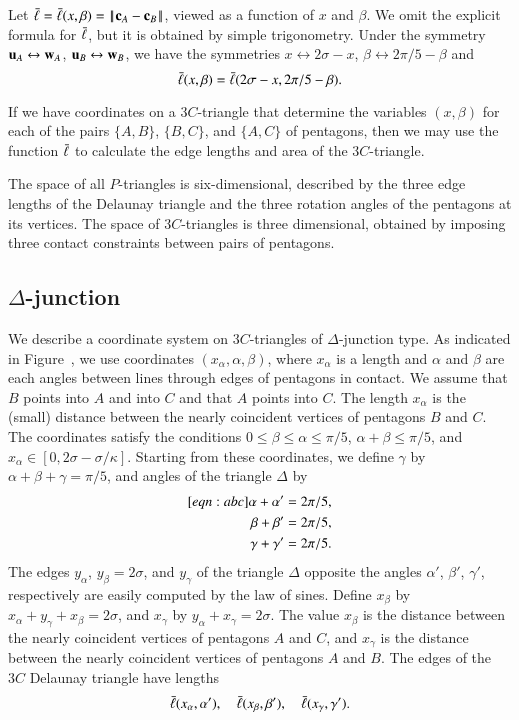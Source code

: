 Let $\bl = \bl(x,\beta) = \norm{\c_A}{\c_B}$, viewed as a function of
$x$ and $\beta$.  We omit the explicit formula for $\bar\ell$, but it is
obtained by simple trigonometry.  Under the symmetry
${\mathbf u}_A\leftrightarrow {\mathbf w}_A$, ${\mathbf u}_B\leftrightarrow{\mathbf w}_B$, we have the
symmetries $x\leftrightarrow 2\sigma-x$, $\beta\leftrightarrow
2\pi/5-\beta$ and
\[
\bar\ell(x,\beta) = \bar\ell(2\sigma-x,2\pi/5 - \beta).
\]

If we have coordinates on a $3C$-triangle that determine the variables
$(x,\beta)$ for each of the pairs $\{A,B\}$, $\{B,C\}$, and $\{A,C\}$
of pentagons, then we may use the function $\bar\ell$ to calculate the edge
lengths and area of the $3C$-triangle.

The space of all $P$-triangles is six-dimensional, described by the
three edge lengths of the Delaunay triangle and the three rotation
angles of the pentagons at its vertices.  The space of $3C$-triangles
is three dimensional, obtained by imposing three contact constraints
between pairs of pentagons.

\subsection{$\Delta$-junction}

We describe a coordinate system on $3C$-triangles of $\Delta$-junction
type.  As indicated in Figure~, we use coordinates
$(x_\alpha,\alpha,\beta)$, where $x_\alpha$ is a length and $\alpha$
and $\beta$ are each angles between lines through edges of pentagons
in contact.  We assume that $B$ points into $A$ and into $C$ and that
$A$ points into $C$. The length $x_\alpha$ is the (small) distance
between the nearly coincident vertices of pentagons $B$ and $C$.  The
coordinates satisfy the conditions $0\le\beta\le\alpha\le\pi/5$,
$\alpha+\beta\le \pi/5$, and $x_\alpha\in[0, 2\sigma -
\sigma/\kappa]$.  Starting from these coordinates, we define $\gamma$
by $\alpha+\beta+\gamma=\pi/5$, and angles of the triangle $\Delta$ by
\begin{align}\libel{eqn:abc}
\alpha+\alpha' &= 2\pi/5,\\
\beta+\beta' &= 2\pi/5,\nonumber\\
\gamma+\gamma' &= 2\pi/5.\nonumber
\end{align}
The edges $y_\alpha$, $y_\beta = 2\sigma$, and $y_\gamma$ of the
triangle $\Delta$ opposite the angles $\alpha'$, $\beta'$, $\gamma'$,
respectively are easily computed by the law of sines.  Define
$x_\beta$ by $x_\alpha+y_\gamma+x_\beta=2\sigma$, and $x_\gamma$ by
$y_\alpha+x_\gamma=2\sigma$.  The value $x_\beta$ is the distance
between the nearly coincident vertices of pentagons $A$ and $C$, and
$x_\gamma$ is the distance between the nearly coincident vertices of
pentagons $A$ and $B$.  The edges of the $3C$ Delaunay triangle have
lengths
\[
\bar\ell(x_\alpha,\alpha'),\quad \bar\ell(x_\beta,\beta'),\quad \bar\ell(x_\gamma,\gamma').
\]

